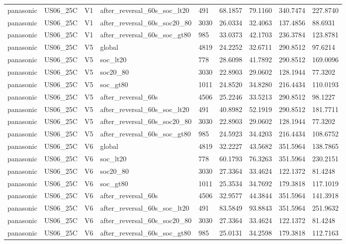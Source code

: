 \begin{tabular}{lllllllll}
panasonic & US06\_25C & V1 & after\_reversal\_60s\_soc\_lt20 & 491 & 68.1857 & 79.1160 & 340.7474 & 227.8740 \\
panasonic & US06\_25C & V1 & after\_reversal\_60s\_soc20\_80 & 3030 & 26.0334 & 32.4063 & 137.4856 & 88.6931 \\
panasonic & US06\_25C & V1 & after\_reversal\_60s\_soc\_gt80 & 985 & 33.0373 & 42.1703 & 236.3784 & 123.8781 \\
panasonic & US06\_25C & V5 & global & 4819 & 24.2252 & 32.6711 & 290.8512 & 97.6214 \\
panasonic & US06\_25C & V5 & soc\_lt20 & 778 & 28.6098 & 41.7892 & 290.8512 & 169.0096 \\
panasonic & US06\_25C & V5 & soc20\_80 & 3030 & 22.8903 & 29.0602 & 128.1944 & 77.3202 \\
panasonic & US06\_25C & V5 & soc\_gt80 & 1011 & 24.8520 & 34.8280 & 216.4434 & 110.0193 \\
panasonic & US06\_25C & V5 & after\_reversal\_60s & 4506 & 25.2246 & 33.5213 & 290.8512 & 98.1227 \\
panasonic & US06\_25C & V5 & after\_reversal\_60s\_soc\_lt20 & 491 & 40.8982 & 52.1919 & 290.8512 & 181.7711 \\
panasonic & US06\_25C & V5 & after\_reversal\_60s\_soc20\_80 & 3030 & 22.8903 & 29.0602 & 128.1944 & 77.3202 \\
panasonic & US06\_25C & V5 & after\_reversal\_60s\_soc\_gt80 & 985 & 24.5923 & 34.4203 & 216.4434 & 108.6752 \\
panasonic & US06\_25C & V6 & global & 4819 & 32.2227 & 43.5682 & 351.5964 & 138.7865 \\
panasonic & US06\_25C & V6 & soc\_lt20 & 778 & 60.1793 & 76.3263 & 351.5964 & 230.2151 \\
panasonic & US06\_25C & V6 & soc20\_80 & 3030 & 27.3364 & 33.4624 & 122.1372 & 81.4248 \\
panasonic & US06\_25C & V6 & soc\_gt80 & 1011 & 25.3534 & 34.7692 & 179.3818 & 117.1019 \\
panasonic & US06\_25C & V6 & after\_reversal\_60s & 4506 & 32.9577 & 44.3844 & 351.5964 & 141.3918 \\
panasonic & US06\_25C & V6 & after\_reversal\_60s\_soc\_lt20 & 491 & 83.5849 & 93.8843 & 351.5964 & 251.9632 \\
panasonic & US06\_25C & V6 & after\_reversal\_60s\_soc20\_80 & 3030 & 27.3364 & 33.4624 & 122.1372 & 81.4248 \\
panasonic & US06\_25C & V6 & after\_reversal\_60s\_soc\_gt80 & 985 & 25.0131 & 34.2598 & 179.3818 & 112.7163 \\

\end{tabular}
